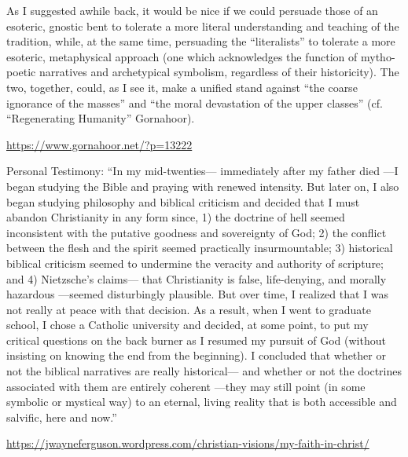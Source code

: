 \begin{footnotesize}
\begin{sffamily}
As I suggested awhile back, it would be nice if we could persuade those of an esoteric, gnostic bent to tolerate a more literal understanding and teaching of the tradition, while, at the same time, persuading the ``literalists'' to tolerate a more esoteric, metaphysical approach (one which acknowledges the function of mytho-poetic narratives and archetypical symbolism, regardless of their historicity). The two, together, could, as I see it, make a unified stand against ``the coarse ignorance of the masses'' and ``the moral devastation of the upper classes'' (cf. ``Regenerating Humanity'' Gornahoor).

\url{https://www.gornahoor.net/?p=13222}


Personal Testimony: ``In my mid-twenties--- immediately after my father died ---I began studying the Bible and praying with renewed intensity. But later on, I also began studying philosophy and biblical criticism and decided that I must abandon Christianity in any form since, 1) the doctrine of hell seemed inconsistent with the putative goodness and sovereignty of God; 2) the conflict between the flesh and the spirit seemed practically insurmountable; 3) historical biblical criticism seemed to undermine the veracity and authority of scripture; and 4) Nietzsche's claims--- that Christianity is false, life-denying, and morally hazardous ---seemed disturbingly plausible. But over time, I realized that I was not really at peace with that decision. As a result, when I went to graduate school, I chose a Catholic university and decided, at some point, to put my critical questions on the back burner as I resumed my pursuit of God (without insisting on knowing the end from the beginning). I concluded that whether or not the biblical narratives are really historical--- and whether or not the doctrines associated with them are entirely coherent ---they may still point (in some symbolic or mystical way) to an eternal, living reality that is both accessible and salvific, here and now.''

\url{https://jwayneferguson.wordpress.com/christian-visions/my-faith-in-christ/}


\end{sffamily}
\end{footnotesize}

